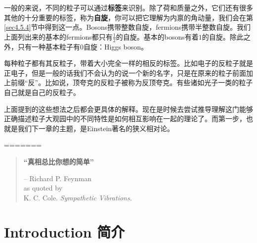 一般的来说，不同的粒子可以通过{\bf 标签}来识别。除了荷和质量之外，它们还有很多其他的十分重要的标签，称为{\bf 自旋}，你可以把它理解为内禀的角动量，我们会在第\ref{sec4.5.4}节中得到这一点。Bosons携带整数自旋，fermions携带半整数自旋。我们上面列出来的基本的fermions都只有$\tfrac{1}{2}$的自旋。基本的bosons有着$1$的自旋。除此之外，只有一种基本粒子有$0$自旋：Higgs boson。

每种粒子都有其反粒子，带着大小完全一样的相反的标签。比如电子的反粒子就是正电子，但是一般的话我们不会认为的说一个新的名字，只是在原来的粒子前面加上前缀``反''。比如说，顶夸克的反粒子被称为反顶夸克。有些诸如光子一类的粒子自己就是自己的反粒子。

上面提到的这些想法之后都会更具体的解释。现在是时候去尝试推导理解这门能够正确描述粒子大观园中的不同特性是如何相互影响在一起的理论了。而第一步，也就是我们下一章的主题，是Einstein著名的狭义相对论。



=======



\begin{quote}%
{\bf “真相总比你想的简单”}


\begin{flushright}
-- Richard P. Feynman\\
as quoted by\\
K. C. Cole. {\it Sympathetic Vibrations.}
\end{flushright}
\end{quote}

\chapter[简介]{Introduction 简介}\label{chap1}

